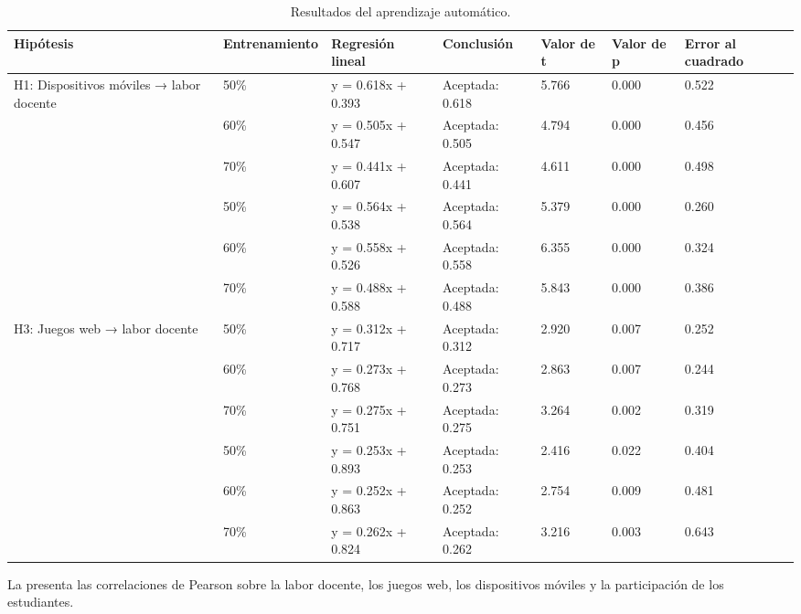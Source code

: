 \documentclass[spanish]{textolivre}
\begin{document}
\begin{table}[htpb]
\caption{Resultados del aprendizaje automático.}
\label{tab3}
\begin{tabular}{p{}p{}p{}p{}p{}p{}p{}}
\toprule
Hipótesis & Entrenamiento & Regresión lineal & Conclusión & Valor de t & Valor de p & Error al cuadrado
\\
\midrule
\multirow{3}{=}{H1: Dispositivos móviles → labor docente} & 50\% & y = 0.618x + 0.393 & Aceptada: 0.618 & 5.766 & 0.000 & 0.522
\\
& 60\%	& y = 0.505x + 0.547 & Aceptada: 0.505 & 4.794 & 0.000 & 0.456
\\
& 70\% & y = 0.441x + 0.607 & Aceptada: 0.441 & 4.611 & 0.000 & 0.498
\\
\arrayrulecolor[gray]{.7}
\midrule
\multirow{3}{=}{H2: Dispositivos móviles → participación de estudiantes} & 50\%	& y = 0.564x + 0.538 & Aceptada: 0.564 & 5.379 & 0.000 & 0.260
\\
& 60\%	& y = 0.558x + 0.526 & Aceptada: 0.558 & 6.355 & 0.000 & 0.324
\\
& 70\% & y = 0.488x + 0.588 & Aceptada: 0.488 & 5.843 & 0.000 & 0.386
\\
\midrule
\multirow{3}{=}{H3: Juegos web → labor docente} & 50\% & y = 0.312x + 0.717 & Aceptada: 0.312 & 2.920 & 0.007 & 0.252
\\
& 60\% & y = 0.273x + 0.768 & Aceptada: 0.273 & 2.863 & 0.007 & 0.244
\\
& 70\% & y = 0.275x + 0.751 & Aceptada: 0.275 & 3.264 & 0.002 & 0.319
\\
\midrule
\arrayrulecolor{black}
\multirow{3}{=}{H4: Juegos web → participación de estudiantes} & 50\% & y = 0.253x + 0.893 & Aceptada: 0.253 & 2.416 & 0.022 & 0.404
\\
& 60\% & y = 0.252x + 0.863 & Aceptada: 0.252 & 2.754 & 0.009 & 0.481
\\
& 70\% & y = 0.262x + 0.824 & Aceptada: 0.262 & 3.216 & 0.003 & 0.643
\\
\bottomrule
\end{tabular}
\end{table}

La  presenta las correlaciones de Pearson sobre la labor docente, los juegos web, los dispositivos móviles y la participación de los estudiantes.
\end{document}
